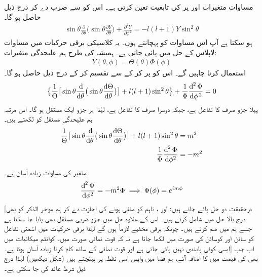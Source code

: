مساوات  متغیرات     اور      پر   کی تابعیت  تعین کرتی ہے۔
اس کو     سے ضرب دے کر درج ذیل حاصل ہو گا۔
\begin{align}\label{مساوات_ابعادی_زاویائی_مساوات}
\sin{\theta}\frac{\partial}{\partial{\theta}}\big(\sin{\theta}\frac{\partial{Y}}{\partial{\theta}}\big)+\frac{\partial^{2}{Y}}{\partial{\phi^{2}}}=-l(l+1)Y\sin^{2}{\theta} 
\end{align}
ہو سکتا ہے آپ اس مساوات کو پہچانتے ہوں۔ یہ کلاسیکی برقی حرکیات میں مساوات لاپلاس کے حل میں پائی جاتی ہے۔ ہمیشہ کی طرح ہم علیحدگی متغیرات:
\begin{align}
Y(\theta,\phi)=\Theta(\theta)\Phi(\phi) 
\end{align}
استعمال کرنا  چاہیں گے۔ اس کو پر کر کے  سے تقسیم کر کے درج ذیل حاصل ہو گا۔ 
\begin{align*}
\big\{\frac{1}{\Theta}\big[\sin{\theta}\frac{\dif}{\dif\theta}\big(\sin\theta\frac{\dif{\Theta}}{\dif{\theta}}\big)\big]+l(l+1)\sin^{2}{\theta}\big\}+\frac{1}{\Phi}\frac{\dif^{\,2}{\Phi}}{\dif{\phi^{\,2}}}=0 
\end{align*}
پہلا جزو صرف     کا تفاعل ہے، جبکہ دوسرا صرف        کا تفاعل ہے، لہٰذا ہر  جزو ایک مستقل ہو گا۔ اس مرتبہ ہم علیحدگی مستقل کو     لکھتے ہیں۔
\begin{align}
\frac{1}{\Theta}\big[\sin{\theta}\frac{\dif}{\dif\theta}\big(\sin\theta\frac{\dif{\Theta}}{\dif{\theta}}\big)\big]+l(l+1)\sin^{2}{\theta}&=m^{2} \\
\frac{1}{\Phi}\frac{\dif^{\,2}{\Phi}}{\dif{\phi^{2}}}&=-m^{2}\label{مساوات_تین_ابعادی_ایم}
\end{align}
 متغیر   کی مساوات زیادہ آسان ہے۔
 \begin{align}
\frac{\dif^{\,2}{\Phi}}{\dif{\phi^{2}}}=-m^{2}\Phi\implies \Phi(\phi)=e^{im\phi} 
\end{align}
[درحقیقت  دو حل پائے جاتے ہیں:  اور ، تاہم  کو منفی ہونے کی اجازت دے کر ہم موخر الذکر کو بھی درج بالا حل میں شامل کرتے ہیں۔ اس کے علاوہ حل میں  جزو ضربی مستقل بھی پایا جا  سکتا ہے جسے ہم     میں ضم کرتے ہیں۔ چونکہ برقی مخفیے   لازماً  ہوں  گے   لہٰذا برقی حرکیات میں اسّمتی تفاعل     کو  سائن اور کوسائن کی صورت میں لکھا جاتا ہے  نہ کہ قوت نمائی صورت میں۔ کوانٹم میکانیات میں ایسی کوئی پابندی نہیں پائی جاتی ہے اور قوت نمائی کے ساتھ کام کرنا زیادہ آسان ہوتا ہے۔] اب جب بھی     کی قیمت  میں   کا اضافہ آئے،  ہم فضا میں واپس اسی نقطہ پر پہنچتے ہیں (شکل   دیکھیں) لہٰذا درج ذیل شرط عائد  کی جا سکتی ہے۔
